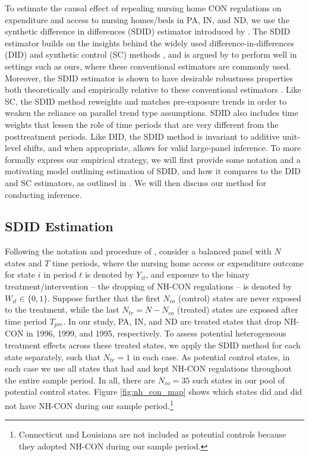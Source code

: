 \documentclass[../Main.tex]{subfiles}
\begin{document}
To estimate the causal effect of repealing nursing home CON regulations on expenditure and access to nursing homes/beds in PA, IN, and ND, we use the synthetic difference in differences (SDID) estimator introduced by \citet{arkhangelsky2021synthetic}. The SDID estimator builds on the insights behind the widely used difference-in-differences (DID) and synthetic control (SC) methods \citep{abadie2003economic,abadie2010synthetic,currie2020technology}, and is argued by \citet{arkhangelsky2021synthetic} to perform well in settings such as ours, where these conventional estimators are commonly used. Moreover, the SDID estimator is shown to have desirable robustness properties both theoretically and empirically relative to these conventional estimators \citep{arkhangelsky2021synthetic}. Like SC, the SDID method reweights and matches pre-exposure trends in order to weaken the reliance on parallel trend type assumptions. SDID also includes time weights that lessen the role of time periods that are very different from the posttreatment periods. Like DID, the SDID method is invariant to additive unit-level shifts, and when appropriate, allows for valid large-panel inference. To more formally express our empirical strategy, we will first provide some notation and a motivating model outlining estimation of SDID, and how it compares to the DID and SC estimators, as outlined in \citet{arkhangelsky2021synthetic}. We will then discuss our method for conducting inference.

\subsection{SDID Estimation} \label{sdid_estimation}

Following the notation and procedure of \citet{arkhangelsky2021synthetic}, consider a balanced panel with $N$ states and $T$ time periods, where the nursing home access or expenditure outcome for state $i$ in period $t$ is denoted by $Y_{it}$, and exposure to the binary treatment/intervention -- the dropping of NH-CON regulations -- is denoted by $W_{it} \in \{0,1\}$. Suppose further that the first $N_{co}$ (control) states are never exposed to the treatment, while the last $N_{tr}=N-N_{co}$ (treated) states are exposed after time period $T_{pre}$. In our study, PA, IN, and ND are treated states that drop NH-CON in 1996, 1999, and 1995, respectively. To assess potential heterogeneous treatment effects across these treated states, we apply the SDID method for each state separately, such that $N_{tr}=1$ in each case. As potential control states, in each case we use all states that had and kept NH-CON regulations throughout the entire sample period. In all, there are $N_{co}=35$ such states in our pool of potential control states. Figure \ref{fig:nh_con_map} shows which states did and did not have NH-CON during our sample period.\footnote{Connecticut and Louisiana are not included as potential controls because they adopted NH-CON during our sample period.}
\end{document}
